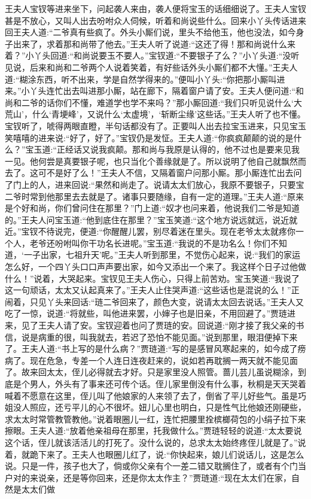 \begin{parag}
    王夫人宝钗等进来坐下，问起袭人来由，袭人便将宝玉的话细细说了。王夫人宝钗甚是不放心，又叫人出去吩咐众人伺候，听着和尚说些什么。回来小丫头传话进来回王夫人道:“二爷真有些疯了。外头小厮们说，里头不给他玉，他也没法，如今身子出来了，求着那和尚带了他去。”王夫人听了说道:“这还了得！那和尚说什么来着？”小丫头回道:“和尚说要玉不要人。”宝钗道:“不要银子了么？”小丫头道:“没听见说，后来和尚和二爷两个人说着笑着，有好些话外头小厮们都不大懂。”王夫人道:“糊涂东西，听不出来，学是自然学得来的。”便叫小丫头:“你把那小厮叫进来。”小丫头连忙出去叫进那小厮，站在廊下，隔着窗户请了安。王夫人便问道:“和尚和二爷的话你们不懂，难道学也学不来吗？”那小厮回道:“我们只听见说什么‘大荒山’，什么‘青埂峰’，又说什么‘太虚境’，‘斩断尘缘’这些话。”王夫人听了也不懂。宝钗听了，唬得两眼直瞪，半句话都没有了。正要叫人出去拉宝玉进来，只见宝玉笑嘻嘻的进来说:“好了，好了。”宝钗仍是发怔。王夫人道:“你疯疯颠颠的说的是什么？”宝玉道:“正经话又说我疯颠。那和尚与我原是认得的，他不过也是要来见我一见。他何尝是真要银子呢，也只当化个善缘就是了。所以说明了他自己就飘然而去了。这可不是好了么！”王夫人不信，又隔着窗户问那小厮。那小厮连忙出去问了门上的人，进来回说:“果然和尚走了。说请太太们放心，我原不要银子，只要宝二爷时常到他那里去去就是了。诸事只要随缘，自有一定的道理。”王夫人道:“原来是个好和尚，你们曾问住在那里？”门上道:“奴才也问来着，他说我们二爷是知道的。”王夫人问宝玉道:“他到底住在那里？”宝玉笑道:“这个地方说远就远，说近就近。”宝钗不待说完，便道:“你醒醒儿罢，别尽着迷在里头。现在老爷太太就疼你一个人，老爷还吩咐叫你干功名长进呢。”宝玉道:“我说的不是功名么！你们不知道，‘一子出家，七祖升天’呢。”王夫人听到那里，不觉伤心起来，说:“我们的家运怎么好，一个四丫头口口声声要出家，如今又添出一个来了。我这样个日子过他做什么！”说着，大哭起来。宝钗见王夫人伤心，只得上前苦劝。宝玉笑道:“我说了这一句顽话，太太又认起真来了。”王夫人止住哭声道:“这些话也是混说的么！”正闹着，只见丫头来回话:“琏二爷回来了，颜色大变，说请太太回去说话。”王夫人又吃了一惊，说道:“将就些，叫他进来罢，小婶子也是旧亲，不用回避了。”贾琏进来，见了王夫人请了安。宝钗迎着也问了贾琏的安。回说道:“刚才接了我父亲的书信，说是病重的很，叫我就去，若迟了恐怕不能见面。”说到那里，眼泪便掉下来了。王夫人道:“书上写的是什么病？”贾琏道:“写的是感冒风寒起来的，如今成了痨病了。现在危急，专差一个人连日连夜赶来的，说如若再耽搁一两天就不能见面了。故来回太太，侄儿必得就去才好。只是家里没人照管。蔷儿芸儿虽说糊涂，到底是个男人，外头有了事来还可传个话。侄儿家里倒没有什么事，秋桐是天天哭着喊着不愿意在这里，侄儿叫了他娘家的人来领了去了，倒省了平儿好些气。虽是巧姐没人照应，还亏平儿的心不很坏。妞儿心里也明白，只是性气比他娘还刚硬些，求太太时常管教管教他。”说着眼圈儿一红，连忙把腰里拴槟榔荷包的小绢子拉下来擦眼。王夫人道:“放着他亲祖母在那里，托我做什么。”贾琏轻轻的说道:“太太要说这个话，侄儿就该活活儿的打死了。没什么说的，总求太太始终疼侄儿就是了。”说着，就跪下来了。王夫人也眼圈儿红了，说:“你快起来，娘儿们说话儿，这是怎么说。只是一件，孩子也大了，倘或你父亲有个一差二错又耽搁住了，或者有个门当户对的来说亲，还是等你回来，还是你太太作主？”贾琏道:“现在太太们在家，自然是太太们做
\end{parag}
